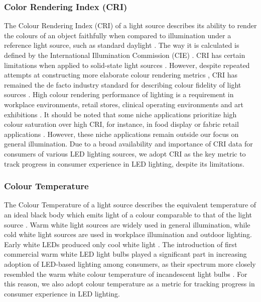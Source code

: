 \documentclass[journal=jacsat,manuscript=article]{achemso}
\begin{document}
\subsubsection{Color Rendering Index (CRI)}

The Colour Rendering Index (CRI) of a light source describes its ability to render the colours of an object faithfully when compared to illumination under a reference light source, such as standard daylight \cite{khan2015led}. The way it is calculated is defined by the International Illumination Commission (CIE) \cite{cie_cri_1995}. CRI has certain limitations when applied to solid-state light sources \cite{david2013cri}. However, despite repeated attempts at constructing more elaborate colour rendering metrics \cite{Houser2013}, CRI has remained the de facto industry standard for describing colour fidelity of light sources \cite{DOE2016LED}. High colour rendering performance of lighting is a requirement in workplace environments, retail stores, clinical operating environments and art exhibitions \cite{khanh2017color}. It should be noted that some niche applications prioritize high colour saturation over high CRI, for instance, in food display or fabric retail applications \cite{david2013cri}. However, these niche applications remain outside our focus on general illumination. Due to a broad availability and importance of CRI data for consumers of various LED lighting sources, we adopt CRI as the key metric to track progress in consumer experience in LED lighting, despite its limitations. 

\subsubsection{Colour Temperature}

The Colour Temperature of a light source describes the equivalent temperature of an ideal black body which emits light of a colour comparable to that of the light source \cite{commission2011cie}. Warm white light sources are widely used in general illumination, while cold white light sources are used in workplace illumination and outdoor lighting. Early white LEDs produced only cool white light \cite{mueller2000light}. The introduction of first commercial warm white LED light bulbs played a significant part in increasing adoption of LED-based lighting among consumers, as their spectrum more closely resembled the warm white colour temperature of incandescent light bulbs \cite{al2016optics}. For this reason, we also adopt colour temperature as a metric for tracking progress in consumer experience in LED lighting.
\end{document}
